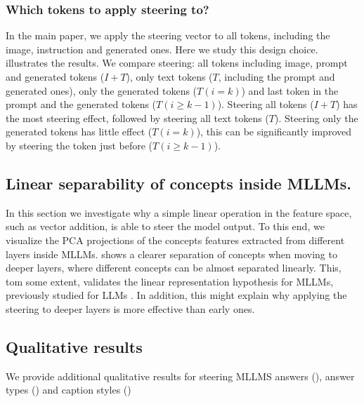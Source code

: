 \subsubsection{Which tokens to apply steering to?}
\label{sec:app_model_steering_ablation_which_tokens}

In the main paper, we apply the steering vector to all tokens, including the image, instruction and generated ones. Here we study this design choice. illustrates the results. We compare steering: all tokens including image, prompt and generated tokens ($I+T$), only text tokens ($T$, including the prompt and generated ones), only the generated tokens ($T (i=k)$) and last token in the prompt and the generated tokens ($T (i \geq k-1)$). Steering all tokens ($I+T$) has the most steering effect, followed by steering all text tokens ($T$). Steering only the generated tokens has little effect ($T (i=k)$), this can be significantly improved by steering the token just before ($T (i \geq k-1)$).




\subsection{Linear separability of concepts inside MLLMs.}
\label{sec:app_linear_sep}

In this section we investigate why a simple linear operation in the feature space, such as vector addition, is able to steer the model output. To this end, we visualize the PCA projections of the concepts features extracted from different layers inside MLLMs.  shows a clearer separation of concepts when moving to deeper layers, where different concepts can be almost separated linearly. This, tom some extent, validates the linear representation hypothesis for MLLMs, previously studied for LLMs \cite{park2024the,nanda_othello_2023}. In addition, this might explain why applying the steering to deeper layers is more effective than early ones.








\subsection{Qualitative results}
\label{sec:app_model_steering_qual}

We provide additional qualitative results for steering MLLMS answers (), answer types () and caption styles
()

